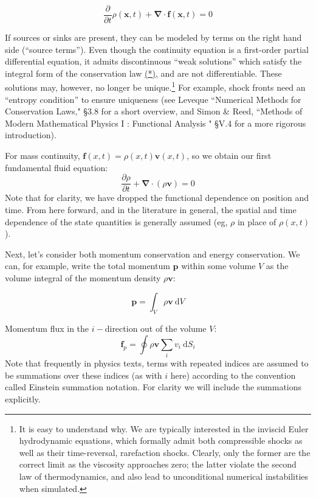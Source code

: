 \documentclass[notoc]{tufte-handout}
\renewcommand{\vec}[1]{
\mathbf{#1}
}
\newcommand{\del}{
\vec{\nabla}
}
\begin{document}
\begin{equation}
    \frac{\partial}{\partial t} \rho(\vec{x},t) + \del\cdot \vec{f}(\vec{x},t) = 0
\end{equation}

If sources or sinks are present, they can be modeled by terms on the right hand side (``source terms''). Even though the continuity equation is a first-order partial differential equation, it admits discontinuous ``weak solutions'' which satisfy the integral form of the conservation law \hyperlink{star}{(*)}, and are not differentiable. These solutions may, however, no longer be unique.\footnote{It is easy to understand why. We are typically interested in the inviscid Euler hydrodynamic equations, which formally admit both compressible shocks as well as their time-reversal, rarefaction shocks. Clearly, only the former are the correct limit as the viscosity approaches zero; the latter violate the second law of thermodynamics, and also lead to unconditional numerical instabilities when simulated.} For example, shock fronts need an ``entropy condition'' to ensure uniqueness (see Leveque ``Numerical Methods for Conservation Laws," \S 3.8 for a short overview, and Simon \& Reed, ``Methods of Modern Mathematical Physics I : Functional Analysis " \S V.4 for a more rigorous introduction). 

For mass continuity, $\vec{f} (x,t)=\rho (x,t) \vec{v}(x,t)$, so we obtain our first fundamental fluid equation:
\begin{equation}
\boxed {\frac{\partial \rho}{\partial t} + \del\cdot (\rho\vec{v}) = 0}
\label {eqn:continuity}
\end{equation}
%
Note that for clarity, we have dropped the functional dependence on position and time. From here forward, and in the literature in general, the spatial and time dependence of the state quantities is generally assumed (eg, $\rho$ in place of $\rho (x, t)$).

Next, let's consider both momentum conservation and energy conservation. We can, for example, write the total momentum $\vec {p}$ within some volume $V$ as the volume integral of the momentum density $\rho \vec {v}$:

\begin{equation}
\vec{p} = \int_V \rho \vec{v}~\mathrm{d}V
\end{equation}

Momentum flux in the $i-$direction out of the volume $V$:
\begin{equation}
    \vec{f}_p = \oint \rho \vec{v} \sum_i v_i~\mathrm{d}S_i
\end{equation}
%
Note that frequently in physics texts, terms with repeated indices are assumed to be summations over these indices (as with $i$ here) according to the convention called Einstein summation notation. For clarity we will include the summations explicitly.
\end{document}
